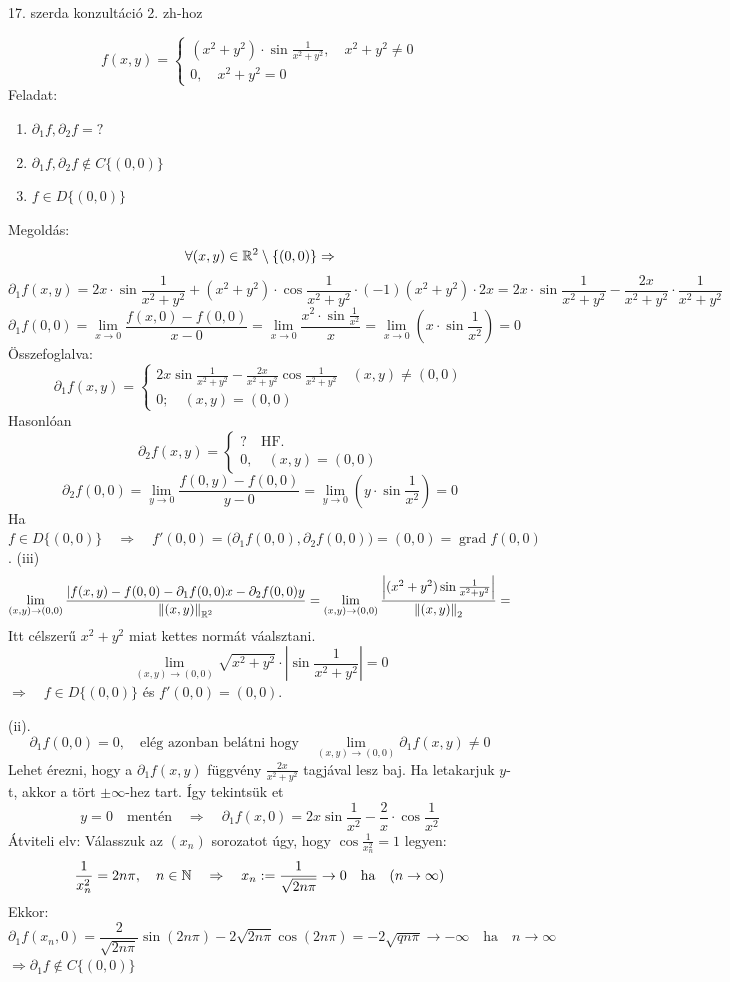 \documentclass[a4paper,11.5pt]{article}
\DeclareMathOperator{\grad}{grad}
\newcommand{\norm}[1]{\left\lVert#1\right\rVert}
\begin{document}
	{\LARGE 17. szerda konzultáció 2. zh-hoz}
	\begin{task}
		\[ f(x,y)=\begin{cases}
			(x^2+y^2)\cdot\sin\frac{1}{x^2+y^2},\quad x^2+y^2\not=0\\
			0,\quad x^2+y^2=0
		\end{cases} \]
		Feladat:
		\begin{enumerate}
			\item $\partial_1f, \partial_2f=?$
			\item $\partial_1f, \partial_2f\notin C\{(0,0)\}$
			\item $f\in D\{(0,0)\}$
		\end{enumerate}
		Megoldás: 
		\[ \forall(x,y)\in\mathbb{R}^2\setminus\{(0,0)\}\Rightarrow \]
		\[ \partial_1f(x,y)=2x\cdot\sin\frac{1}{x^2+y^2}+(x^2+y^2)\cdot\cos\frac{1}{x^2+y^2}\cdot(-1)(x^2+y^2)\cdot2x=2x\cdot\sin\frac{1}{x^2+y^2}-\frac{2x}{x^2+y^2}\cdot\frac{1}{x^2+y^2} \]
		\[ \partial_1f(0,0)=\lim_{x\to0}\frac{f(x,0)-f(0,0)}{x-0}=\lim_{x\to0}\frac{x^2\cdot\sin\frac{1}{x^2}}{x}=\lim_{x\to0}(x\cdot\sin\frac{1}{x^2})=0 \]
		Összefoglalva:
		\[ \partial_1f(x,y)=\begin{cases}
			2x\sin\frac{1}{x^2+y^2}-\frac{2x}{x^2+y^2}\cos\frac{1}{x^2+y^2}\quad (x,y)\not=(0,0)\\
			0;\quad (x,y)=(0,0)
		\end{cases} \]
		Hasonlóan
		\[ \partial_2f(x,y)=\begin{cases}
			?\quad \text{HF.}\\
			0,\quad (x,y)=(0,0)
		\end{cases} \]
		\[ \partial_2f(0,0)=\lim_{y\to0}\frac{f(0,y)-f(0,0)}{y-0}=\lim_{y\to0}(y\cdot\sin\frac{1}{x^2})=0 \]
		Ha $f\in D\{(0,0)\}\quad \Rightarrow\quad f'(0,0)=\big(\partial_1f(0,0),\partial_2f(0,0)\big) =(0,0)=\grad f(0,0)$.
		(iii)
		\[ \lim_{(x,y)\to(0,0)}\frac{|f(x,y)-f(0,0)-\partial_1f(0,0)x-\partial_2f(0,0)y}{\norm{(x,y)}_{\R^2} }=\lim_{(x,y)\to(0,0)}\frac{\left|(x^2+y^2)\sin\frac{1}{x^2+y^2}\right|}{\norm{(x,y)}_{2}}= \]
		Itt célszerű $x^2+y^2$ miat kettes normát váalsztani.
		\[ \lim_{(x,y)\to(0,0)}\sqrt{x^2+y^2}\cdot\left|\sin\frac{1}{x^2+y^2}\right|=0 \]
		$\Rightarrow\quad f\in D\{(0,0)\}$ és $f'(0,0)=(0,0)$.
		
		(ii). 
		\[ \partial_1f(0,0)=0,\quad \text{elég azonban belátni hogy}\quad \lim_{(x,y)\to(0,0)}\partial_1f(x,y)\not=0 \]
		Lehet érezni, hogy a $\partial_1f(x,y)$ függvény $\frac{2x}{x^2+y^2}$ tagjával lesz baj. Ha letakarjuk $y$-t, akkor a tört $\pm\infty$-hez tart. Így tekintsük et
		\[ y=0\quad \text{mentén}\quad \Rightarrow\quad \partial_1f(x,0)=2x\sin\frac{1}{x^2}-\frac{2}{x}\cdot\cos\frac{1}{x^2} \]
		Átviteli elv: Válasszuk az $(x_n)$ sorozatot úgy, hogy $\cos\frac{1}{x^2_n}=1$ legyen:
		\[ \frac{1}{x^2_n}=2n\pi,\quad n\in\mathbb{N}\quad \Rightarrow\quad x_n:=\frac{1}{\sqrt{2n\pi}}\to0\quad \text{ha}\quad (n\to\infty) \]
		Ekkor:
		\[ \partial_1f(x_n,0)=\frac{2}{\sqrt{2n\pi}}\sin(2n\pi)-2\sqrt{2n\pi}\cos(2n\pi)=-2\sqrt{qn\pi}\to-\infty\quad \text{ha}\quad n\to\infty \]
		$\Rightarrow \partial_1f\notin C\{(0,0)\}$
	\end{task}
\end{document}
